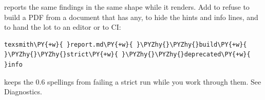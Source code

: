 \documentclass[a4paper,twoside]{article}
\begin{document}
 reports the same findings in the same shape while it renders. Add
 to refuse to build a PDF from a document that has any,  to hide
the hints and info lines, and  to hand the lot to an
editor or to CI:
\begin{tscode}[lang=bash, engine=pygments]
\begin{Verbatim}[commandchars=\\\{\},breaklines, breakanywhere, commandchars=\\\{\}]
texsmith\PY{+w}{ }report.md\PY{+w}{ }\PYZhy{}\PYZhy{}build\PY{+w}{ }\PYZhy{}\PYZhy{}strict\PY{+w}{ }\PYZhy{}\PYZhy{}deprecated\PY{+w}{ }info
\end{Verbatim}
\end{tscode}
 keeps the 0.6 spellings from failing a strict run while you
work through them. See Diagnostics.
\end{document}
